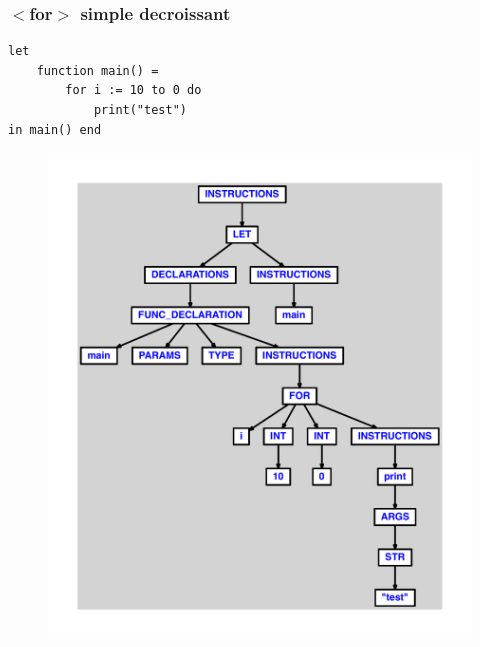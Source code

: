 \documentclass{article}
\begin{document}
\subsubsection{$ < $for$ > $ simple decroissant}
\begin{lstlisting}
let
	function main() =
		for i := 10 to 0 do
			print("test")
in main() end
\end{lstlisting}
\newpage
\begin{figure}[H]
\centering
\includegraphics[max width=\textwidth]{ast/ast_206.pdf}
\end{figure}
\newpage
\end{document}
